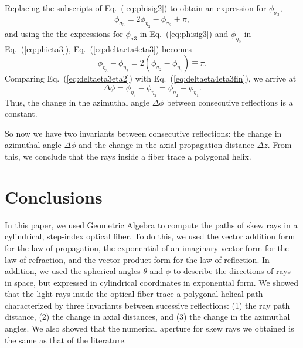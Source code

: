 \documentclass[a4paper,twocolumn,superscriptaddress]{revtex4-1}
\begin{document}
{Replacing the subscripts of Eq.~(\ref{eq:phisig2}) to obtain an expression for $\phi_{\sigma_3}$,%
\begin{equation}
\label{eq:phisig3}
  \phi_{\sigma_3} = 2\phi_{\eta_3} - \phi_{\sigma_2} \pm \pi ,
\end{equation}
and using the the expressions for $\phi_{\sigma 3}$ in Eq.~(\ref{eq:phisig3}) and $\phi_{ \eta_2 }$ in Eq.~(\ref{eq:phieta3}), Eq.~(\ref{eq:deltaeta4eta3}) becomes
\begin{equation}
\label{eq:deltaeta4eta3fin}
\phi_{ \eta_3 } - \phi_{ \eta_2 } = 2(\phi_{ \sigma_2 } - \phi_{ \eta_1 }) \mp \pi .
\end{equation}
Comparing Eq.~(\ref{eq:deltaeta3eta2}) with Eq.~(\ref{eq:deltaeta4eta3fin}), we arrive at 
\begin{equation}
\Delta \phi =
\phi_{ \eta_3 } - \phi_{ \eta_2 } = \phi_{ \eta_2 } - \phi_{ \eta_1 } .
\end{equation}
Thus, the change in the azimuthal angle $\Delta \phi$ between consecutive reflections is a constant.

So now we have two invariants between consecutive reflections: the change in azimuthal angle $\Delta \phi$ and the change in the axial propagation distance $\Delta z$. From this, we conclude that the rays inside a fiber trace a polygonal helix.


%

\section{Conclusions}
\label{sec:conclusion}

In this paper, we used Geometric Algebra to compute the paths of skew rays in a cylindrical, step-index optical fiber. To do this, we used the vector addition form for the law of propagation, the exponential of an imaginary vector form for the law of refraction, and the vector product form for the law of reflection. In addition, we used the spherical angles $\theta$ and $\phi$ to describe the directions of rays in space, but expressed in cylindrical coordinates in exponential form. We showed that the light rays inside the optical fiber trace a polygonal helical path characterized by three invariants between sucessive reflections: (1) the ray path distance, (2) the change in axial distances, and (3) the change in the azimuthal angles. We also showed that the numerical aperture for skew rays we obtained is the same as that of the literature.

}
\end{document}
